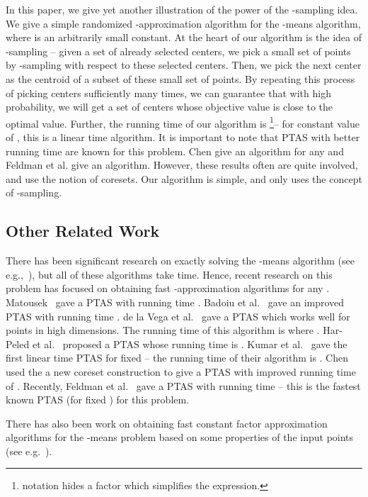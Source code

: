 \documentclass[a4paper]{article}
\begin{document}
In this paper, we give yet another illustration of the power of the -sampling idea. We give a simple randomized
-approximation algorithm for the -means algorithm, where  is an arbitrarily small constant.
At the heart of our algorithm is the idea of -sampling -- given a set of already selected centers, we pick
a small set of points by -sampling with respect to these selected centers. Then, we pick the next
center as the centroid of a subset of these small set of points. By repeating this process of picking  centers
sufficiently many times, we can guarantee that with high probability, we will get a set of  centers whose objective
value is close to the optimal value. Further, the running time of our algorithm is  \footnote{ 
notation hides a  factor which simplifies the expression.}--
for constant value of , this is a linear time algorithm.
 It is important to note that PTAS with better running time are known
for this problem. Chen \cite{Chen06} give an  algorithm for any  and Feldman et al. \cite{FeldmanMS07} give an  algorithm.
However, these results often are quite involved, and use the notion of coresets. Our algorithm is simple, and only uses the concept of -sampling.

\subsection{Other Related Work}
There has been significant research on exactly solving the -means algorithm (see e.g.,~\cite{inaba}), but all of these algorithms
take  time. Hence, recent research on this problem has focused on obtaining fast -approximation
algorithms for any . Matousek~\cite{Matousek00} gave  a PTAS
with running time  . Badoiu et al.~\cite{BadoiuHI02}
gave an improved PTAS with running time
. de la Vega et al.~\cite{VegaKKR03} gave a PTAS which works well for points
in high dimensions. The running time of this algorithm is  where
.  Har-Peled et al.~\cite{Har-PeledM04}  proposed a PTAS whose running time
is . Kumar et al.~\cite{KumarSS10} gave the first
linear time PTAS for fixed  -- the running time of their algorithm is . Chen~\cite{Chen06}
used the a new coreset construction to  give a PTAS with improved running time of .
Recently, Feldman et al.~\cite{FeldmanMS07} gave a PTAS with running time  -- this is the fastest known PTAS (for fixed ) for this problem.

There has also been work on obtaining fast constant factor approximation algorithms for the -means problem
based on some properties of the input points (see e.g.~\cite{OstrovskyRSS06,AwasthiBS10}).
\end{document}
